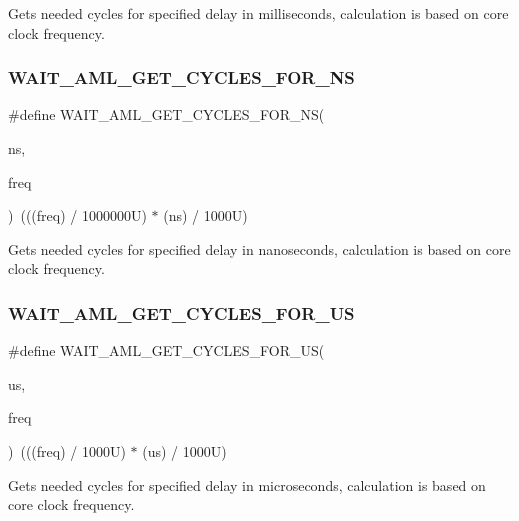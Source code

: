 Gets needed cycles for specified delay in milliseconds, calculation is based on core clock frequency. \mbox{\label{group__macro__group_ga316e8d701e2fd6dbd036f635d15ac309}} 
\subsubsection{\texorpdfstring{WAIT\_AML\_GET\_CYCLES\_FOR\_NS}{WAIT\_AML\_GET\_CYCLES\_FOR\_NS}}
{\footnotesize\ttfamily \#define W\+A\+I\+T\+\_\+\+A\+M\+L\+\_\+\+G\+E\+T\+\_\+\+C\+Y\+C\+L\+E\+S\+\_\+\+F\+O\+R\+\_\+\+NS(\begin{DoxyParamCaption}\item[{}]{ns,  }\item[{}]{freq }\end{DoxyParamCaption})~(((freq) / 1000000\+U) $\ast$ (ns) / 1000\+U)}

Gets needed cycles for specified delay in nanoseconds, calculation is based on core clock frequency. \mbox{\label{group__macro__group_gad49b8fcd743fd4f170294d409a8acdee}} 
\subsubsection{\texorpdfstring{WAIT\_AML\_GET\_CYCLES\_FOR\_US}{WAIT\_AML\_GET\_CYCLES\_FOR\_US}}
{\footnotesize\ttfamily \#define W\+A\+I\+T\+\_\+\+A\+M\+L\+\_\+\+G\+E\+T\+\_\+\+C\+Y\+C\+L\+E\+S\+\_\+\+F\+O\+R\+\_\+\+US(\begin{DoxyParamCaption}\item[{}]{us,  }\item[{}]{freq }\end{DoxyParamCaption})~(((freq) / 1000\+U) $\ast$ (us) / 1000\+U)}

Gets needed cycles for specified delay in microseconds, calculation is based on core clock frequency. 